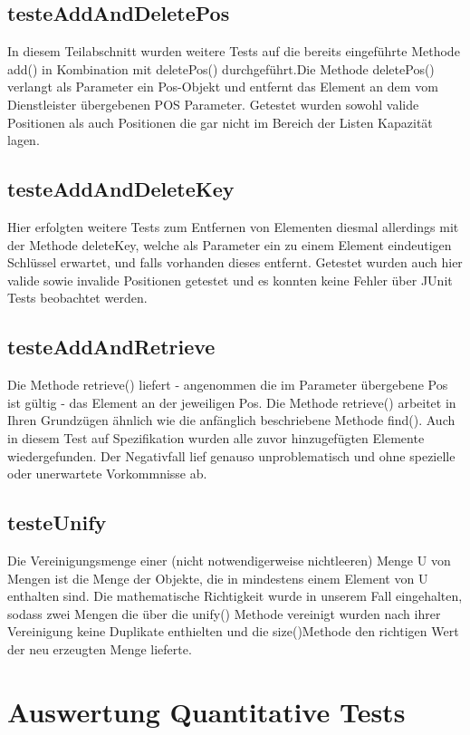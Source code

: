 \documentclass[paper=a4, fontsize=11pt]{scrartcl} %
\numberwithin{equation}{section} %
\numberwithin{figure}{section} %
\numberwithin{table}{section} %
\begin{document}
\subsection{testeAddAndDeletePos}
In diesem Teilabschnitt wurden weitere Tests auf die bereits eingeführte Methode add() in Kombination mit deletePos() durchgeführt.Die Methode deletePos() verlangt als
Parameter ein Pos-Objekt und entfernt das Element an dem vom Dienstleister übergebenen POS Parameter. Getestet wurden sowohl valide Positionen als auch Positionen die gar
nicht im Bereich der Listen Kapazität lagen. 

\subsection{testeAddAndDeleteKey}
Hier erfolgten weitere Tests zum Entfernen von Elementen diesmal allerdings mit der Methode deleteKey, welche als Parameter ein zu einem Element eindeutigen Schlüssel erwartet,
und falls vorhanden dieses entfernt. Getestet wurden auch hier valide sowie invalide Positionen getestet und es konnten keine Fehler über JUnit Tests beobachtet werden. 

\subsection{testeAddAndRetrieve}
Die Methode retrieve() liefert - angenommen die im Parameter übergebene Pos ist gültig - das Element an der jeweiligen Pos. Die Methode retrieve() arbeitet in Ihren Grundzügen 
ähnlich wie die anfänglich beschriebene Methode find(). Auch in diesem Test auf Spezifikation wurden alle zuvor hinzugefügten Elemente wiedergefunden. Der Negativfall lief genauso unproblematisch und 
ohne spezielle oder unerwartete Vorkommnisse ab. 

\subsection{testeUnify}
Die Vereinigungsmenge einer (nicht notwendigerweise nichtleeren) Menge U von Mengen ist die Menge der Objekte, die in mindestens einem Element von U enthalten sind.
Die mathematische Richtigkeit wurde in unserem Fall eingehalten, sodass zwei Mengen die über die unify() Methode vereinigt wurden nach ihrer Vereinigung keine Duplikate enthielten und die size()Methode 
den richtigen Wert der neu erzeugten Menge lieferte.  

\section{Auswertung Quantitative Tests}
\end{document}
